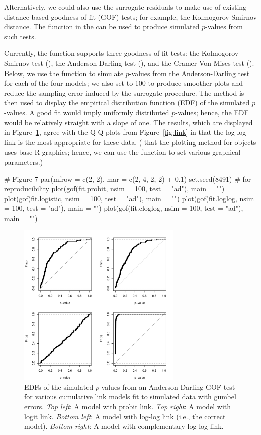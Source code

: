 Alternatively, we could also use the surrogate residuals to make use of existing distance-based goodness-of-fit (GOF) tests; for example, the Kolmogorov-Smirnov distance. The  function in the  can be used to produce simulated $p$-values from such tests. 

Currently, the  function supports three goodness-of-fit tests: the Kolmogorov-Smirnov test (), the Anderson-Darling test (), and the Cramer-Von Mises test (). Below, we use the  function to simulate $p$-values from the Anderson-Darling test for each of the four models; we also set  to 100 to produce smoother plots and reduce the sampling error induced by the surrogate procedure. The  method is then used to display the empirical distribution function (EDF) of the simulated $p$-values. A good fit would imply uniformly distributed $p$-values; hence, the EDF would be relatively straight with a slope of one. The results, which are displayed in Figure~\ref{fig:gof}, agree with the Q-Q plots from Figure~\ref{fig:link} in that the log-log link is the most appropriate for these data. ( that the plotting method for  objects uses base R graphics; hence, we can use the  function to set various graphical parameters.)
\begin{example}
# Figure 7
par(mfrow = c(2, 2), mar = c(2, 4, 2, 2) + 0.1) 
set.seed(8491)  # for reproducibility
plot(gof(fit.probit, nsim = 100, test = "ad"), main = "")
plot(gof(fit.logistic, nsim = 100, test = "ad"), main = "")
plot(gof(fit.loglog, nsim = 100, test = "ad"), main = "")
plot(gof(fit.cloglog, nsim = 100, test = "ad"), main = "")
\end{example}

\begin{figure}[!htbp]
  \centering
  \includegraphics[width=0.7\textwidth]{gof}
  \caption{EDFs of the simulated $p$-values from an Anderson-Darling GOF test for various cumulative link models fit to simulated data with gumbel errors. \textit{Top left}: A model with probit link. \textit{Top right}: A model with logit link. \textit{Bottom left}: A model with log-log link (i.e., the correct model). \textit{Bottom right}: A model with complementary log-log link.}  
  \label{fig:gof}
\end{figure}


